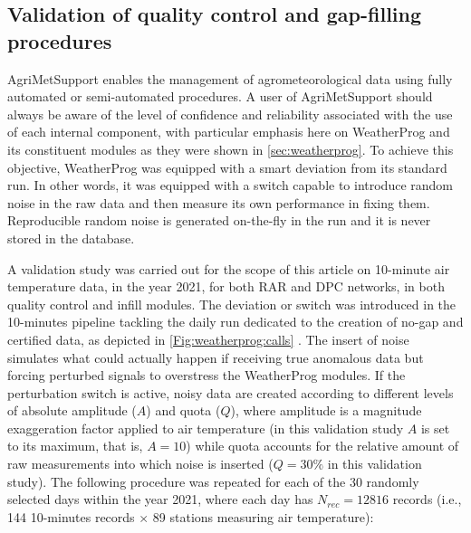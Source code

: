\documentclass[authoryear,preprint,review,12pt]{elsarticle}
\newcommand{\note}[1]{\emph{\textcolor{red}{#1}}}
\begin{document}
\subsection{Validation of quality control and gap-filling procedures} \label{sec:QcheckValidation}
AgriMetSupport enables the management of agrometeorological data using fully automated or semi-automated procedures. %
A user of AgriMetSupport should always be aware of the level of confidence and reliability associated with the use of each internal component, with particular emphasis here on WeatherProg and its constituent modules as they were shown in \cref{sec:weatherprog}. 
To achieve this objective, WeatherProg was equipped with a smart deviation from its standard run.
In other words, it was equipped with a switch capable to introduce random noise in the raw data and then measure its own performance in fixing them. %
Reproducible random noise is generated on-the-fly in the run and it is never stored in the database.

A validation study was carried out for the scope of this article on 10-minute air temperature data, in the year 2021, for both RAR and DPC networks, in both quality control and infill modules.
The deviation or switch was introduced in the 10-minutes pipeline tackling the daily run dedicated to the creation of no-gap and certified data, as depicted in \cref{Fig:weatherprog:calls} .%
The insert of noise simulates what could actually happen if receiving true anomalous data but forcing perturbed signals to overstress the WeatherProg modules.
If the perturbation switch is active, noisy data are created according to different levels of absolute amplitude ($A$) and quota ($Q$), where amplitude is a magnitude exaggeration factor applied to air temperature (in this validation study $A$ is set to its maximum, that is, $A=10$) while quota accounts for the relative amount of raw measurements into which noise is inserted ($Q=30\%$ in this validation study).
The following procedure was repeated for each of the 30
randomly selected days within the year 2021, where each day has $N_{rec}=12816$ records (i.e., 144 10-minutes records $\times$ 89 stations measuring air temperature):
\end{document}
